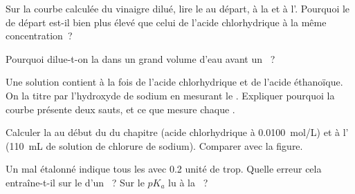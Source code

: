 \begin{exercise}[$\star\star$]\label{exo:g12:ph-conductivity-titrations:10}
Sur la courbe calculée du vinaigre dilué, lire le  au départ, à la
 et à l'. Pourquoi le  de départ est-il
bien plus élevé que celui de l'acide chlorhydrique à la même
concentration~?
\end{exercise}

\begin{exercise}[$\star\star$]\label{exo:g12:ph-conductivity-titrations:11}
Pourquoi dilue-t-on la  dans un grand volume d'eau avant
un ~?
\end{exercise}

\begin{exercise}[$\star\star\star$]\label{exo:g12:ph-conductivity-titrations:12}
Une solution contient à la fois de l'acide chlorhydrique et de l'acide
éthanoïque. On la titre par l'hydroxyde de sodium en mesurant le .
Expliquer pourquoi la courbe présente deux sauts, et ce que mesure
chaque .
\end{exercise}

\begin{exercise}[$\star\star\star$]\label{exo:g12:ph-conductivity-titrations:13}
Calculer la  au début du  du
chapitre (acide chlorhydrique à \qty{0.0100}{mol/L}) et à l'
(\qty{110}{mL} de solution de chlorure de sodium). Comparer avec la
figure.
\end{exercise}

\begin{exercise}[$\star\star\star$]\label{exo:g12:ph-conductivity-titrations:14}
Un  mal étalonné indique tous les  avec 0.2 unité de trop.
Quelle erreur cela entraîne-t-il sur le  d'un
~? Sur le $pK_a$
lu à la ~?
\end{exercise}

